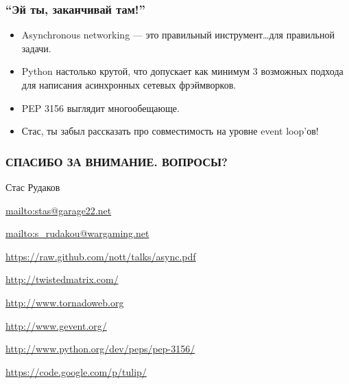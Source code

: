 \documentclass[aspectratio=169]{beamer}
\begin{document}
\begin{frame}
  \frametitle{``Эй ты, заканчивай там!''}
  \begin{itemize}
    \item Asynchronous networking --- это правильный инструмент\ldots для правильной задачи.
    \item Python настолько крутой, что допускает как минимум 3 возможных подхода для написания асинхронных сетевых фрэймворков.
    \item PEP 3156 выглядит многообещающе.
      \pause
    \item Стас, ты забыл рассказать про совместимость на уровне event loop'ов!
  \end{itemize}
\end{frame}


\begin{finalframe}
  \frametitle{СПАСИБО ЗА ВНИМАНИЕ. ВОПРОСЫ?}
    \begin{block}{Стас Рудаков}
    \par \url{mailto:stas@garage22.net}
    \par \url{mailto:s_rudakou@wargaming.net}
    \par \url{https://raw.github.com/nott/talks/async.pdf}
    \end{block}

    \begin{block}
    \par \url{http://twistedmatrix.com/}
    \par \url{http://www.tornadoweb.org}
    \par \url{http://www.gevent.org/}
    \par \url{http://www.python.org/dev/peps/pep-3156/}
    \par \url{https://code.google.com/p/tulip/}
    \end{block}

\end{finalframe}
\end{document}

